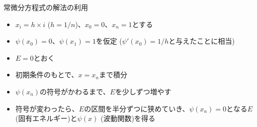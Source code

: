 \begin{frame}[t,fragile]{常微分方程式の解法の利用}
  \begin{itemize}
  \item $x_i=h \times i$ ($h=1/n$)、$x_0=0$、$x_n=1$とする
  \item $\psi(x_0)=0$、$\psi(x_1) = 1$を仮定 ($\psi'(x_0)=1/h$と与えたことに相当)
  \item $E = 0$とおく
  \item 初期条件のもとで、$x=x_n$まで積分
  \item $\psi(x_n)$の符号がかわるまで、$E$を少しずつ増やす
  \item 符号が変わったら、$E$の区間を半分ずつに狭めていき、$\psi(x_n)=0$となる$E$ (固有エネルギー)と$\psi(x)$ (波動関数)を得る
  \end{itemize}
\end{frame}
